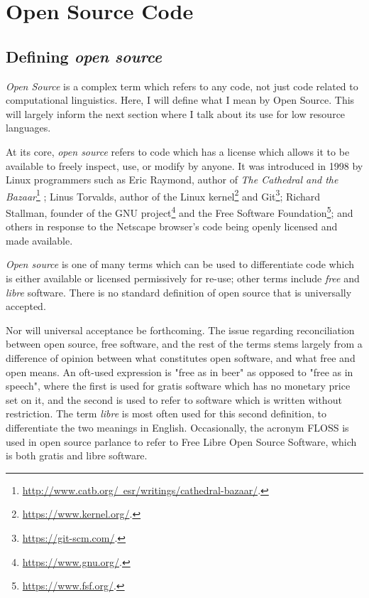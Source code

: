 \section{Open Source Code}
\label{sec:open-source}


\subsection{Defining {\it open source}}
\label{subsec:defining-open-source}

{\it Open Source} is a complex term which refers to any code, not just code related to computational linguistics. Here, I will define what I mean by Open Source. This will largely inform the next section where I talk about its use for low resource languages.

At its core, {\it open source} refers to code which has a license which allows it to be available to freely inspect, use, or modify by anyone. It was introduced in 1998 by Linux programmers such as Eric Raymond, author of {\it The Cathedral and the Bazaar}\footnote{\href{http://www.catb.org/~esr/writings/cathedral-bazaar/}{http://www.catb.org/~esr/writings/cathedral-bazaar/}. } \citep{raymond1999cathedral}; Linus Torvalds, author of the Linux kernel\footnote{\href{https://www.kernel.org/}{https://www.kernel.org/}. } and Git\footnote{\href{https://git-scm.com/}{https://git-scm.com/}. }; Richard Stallman, founder of the GNU project\footnote{\href{https://www.gnu.org/}{https://www.gnu.org/}. } and the Free Software Foundation\footnote{\href{https://www.fsf.org/}{https://www.fsf.org/}. }; and others in response to the Netscape browser's code being openly licensed and made available.

{\it Open source} is one of many terms which can be used to differentiate code which is either available or licensed permissively for re-use; other terms include {\it free} and {\it libre} software. There is no standard definition of open source that is universally accepted.

Nor will universal acceptance be forthcoming. The issue regarding reconciliation between open source, free software, and the rest of the terms stems largely from a difference of opinion between what constitutes open software, and what free and open means. An oft-used expression is "free as in beer" as opposed to "free as in speech", where the first is used for gratis software which has no monetary price set on it, and the second is used to refer to software which is written without restriction. The term {\it libre} is most often used for this second definition, to differentiate the two meanings in English. Occasionally, the acronym FLOSS is used in open source parlance to refer to Free Libre Open Source Software, which is both gratis and libre software.

